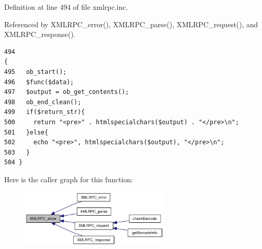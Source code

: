 Definition at line 494 of file xmlrpc.inc.

Referenced by XMLRPC\_\-error(), XMLRPC\_\-parse(), XMLRPC\_\-request(), and XMLRPC\_\-response().

\begin{Code}\begin{verbatim}494                                                                    {
495   ob_start();
496   $func($data);
497   $output = ob_get_contents();
498   ob_end_clean();
499   if($return_str){
500     return "<pre>" . htmlspecialchars($output) . "</pre>\n";
501   }else{
502     echo "<pre>", htmlspecialchars($output), "</pre>\n";
503   }
504 }
\end{verbatim}
\end{Code}




Here is the caller graph for this function:\nopagebreak
\begin{figure}[H]
\begin{center}
\leavevmode
\includegraphics[width=203pt]{xmlrpc_8inc_1f60d2672bcb35f5ff908f64931f8d48_icgraph}
\end{center}
\end{figure}
